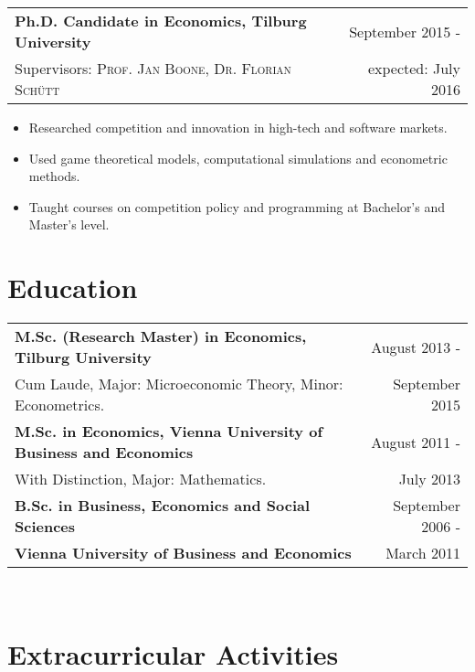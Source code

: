 \documentclass[a4paper,9pt]{article}
\begin{document}
\begin{tabular}{p{15cm} r}
	\textbf{Ph.D. Candidate in Economics, Tilburg University} &September 2015 -\\
	\small Supervisors:  \textsc{Prof. Jan Boone},  \textsc{Dr. Florian Schütt} & expected: July 2016\phantom{ -}\\
\end{tabular}\vspace{-0.5em}
\begin{itemize}[noitemsep]
	\item Researched competition and innovation in high-tech and software markets.
	\item Used game theoretical models, computational simulations and econometric methods.
	\item Taught courses on competition policy and programming at Bachelor's and Master's level.
\end{itemize}

\section{Education}%

\begin{tabular}{p{15cm} r}
	\textbf{M.Sc. (Research Master) in Economics, Tilburg University}&  August 2013 -\\
	Cum Laude, Major: Microeconomic Theory, Minor: Econometrics.& September 2015\hphantom{-}
	\vspace{0.5em}\\
	\textbf{M.Sc. in Economics, Vienna University of Business and Economics}& August 2011 -\\
	With Distinction, Major: Mathematics. & July 2013\phantom{-}
	\vspace{0.5em}\\ 
	\textbf{B.Sc. in Business, Economics and Social Sciences}& September 2006 -\\ 
	\textbf{Vienna University of Business and Economics}& March 2011\phantom{- }\\
\end{tabular}\\

\section{Extracurricular Activities }
\end{document}
